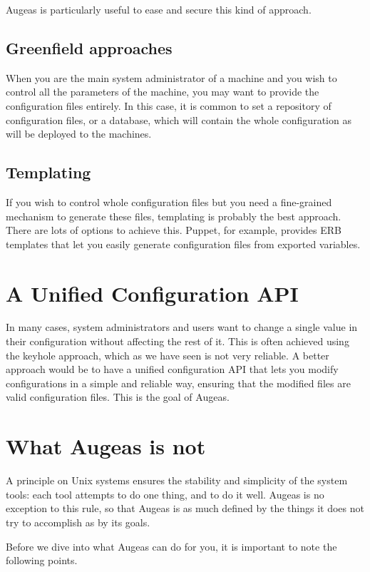 Augeas is particularly useful to ease and secure this kind of approach.

\subsection{Greenfield approaches}

When you are the main system administrator of a machine and you wish to control all the parameters of the machine, you may want to provide the configuration files entirely. In this case, it is common to set a repository of configuration files, or a database, which will contain the whole configuration as will be deployed to the machines.

\subsection{Templating}

If you wish to control whole configuration files but you need a fine-grained mechanism to generate these files, templating is probably the best approach. There are lots of options to achieve this. Puppet, for example, provides ERB templates that let you easily generate configuration files from exported variables.

\section{A Unified Configuration API}

In many cases, system administrators and users want to change a single value in their configuration without affecting the rest of it. This is often achieved using the keyhole approach, which as we have seen is not very reliable. A better approach would be to have a unified configuration API that lets you modify configurations in a simple and reliable way, ensuring that the modified files are valid configuration files. This is the goal of Augeas.

\section{What Augeas is not}

A principle on Unix systems ensures the stability and simplicity of the system tools: each tool attempts to do one thing, and to do it well. Augeas is no exception to this rule, so that Augeas is as much defined by the things it does not try to accomplish as by its goals.

Before we dive into what Augeas can do for you, it is important to note the following points.

